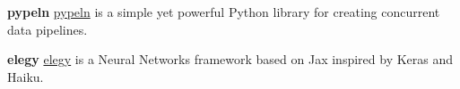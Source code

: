 \begin{cventries}
  \cventry
    {\textbf{pypeln}}
    {}
    {}
    {}
    {
      \href{https://github.com/cgarciae/pypeln}{pypeln} is a simple yet powerful Python library for creating concurrent data pipelines.
    }

  \cventry
    {\textbf{elegy}}
    {}
    {}
    {}
    {
      \href{https://github.com/poets-ai/elegy}{elegy} is a Neural Networks framework based on Jax inspired by Keras and Haiku.
    }

\end{cventries}
